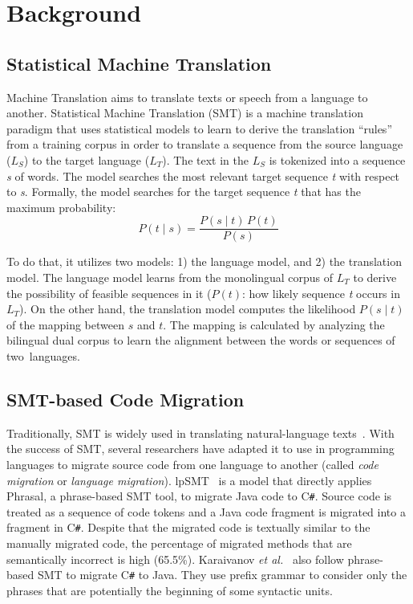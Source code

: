 \section{Background}
\label{sec:background}

\subsection{Statistical Machine Translation}

Machine Translation aims to translate texts or speech from a language
to another. Statistical Machine Translation (SMT) is a machine
translation paradigm that uses statistical models to learn to derive
the translation ``rules'' from a training corpus in order to translate
a sequence from the source language ($L_S$) to the target language
($L_T$). The text in the $L_S$ is tokenized into a sequence \textit{s}
of words. The model searches the most relevant target sequence
\textit{t} with respect to \textit{s}. Formally, the model searches
for the target sequence \textit{t} that has the maximum probability:
$$ P\left(t \mid s \right) = \frac{P\left(s \mid t\right) \, P\left(t\right)}{P\left(s\right)} $$

To do that, it utilizes two models: 1) the language model, and 2)
the translation model. The language model learns from the monolingual
corpus of $L_T$ to derive the possibility of feasible sequences in it
($P\left(t\right)$: how likely sequence \textit{t} occurs in
$L_T$). On the other hand, the translation model computes the
likelihood $P\left(s \mid t\right)$ of the mapping between $s$ and
$t$. The mapping is calculated by analyzing the bilingual dual corpus
to learn the alignment between the words or sequences of
two~languages.

\subsection{SMT-based Code Migration}

Traditionally, SMT is widely used in translating natural-language
texts~\cite{smtbook}. With the success of SMT, several researchers
have adapted it to use in programming languages to migrate source code
from one language to another (called {\em code migration} or {\em
  language migration}). lpSMT~\cite{fse13-nier} is a model that
directly applies Phrasal, a phrase-based SMT tool, to migrate Java
code to C\texttt{\#}. Source code is treated as a sequence of code
tokens and a Java code fragment is migrated into a fragment in
C\texttt{\#}. Despite that the migrated code is textually similar to
the manually migrated code, the percentage of migrated methods that
are semantically incorrect is high (65.5\%).
%
Karaivanov {\em et al.}~\cite{karaivanov14} also follow phrase-based SMT to
migrate C\texttt{\#} to Java. They use prefix grammar to consider only
the phrases that are potentially the beginning of some syntactic
units.

